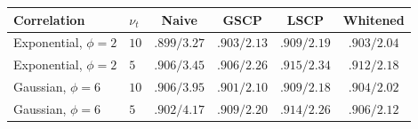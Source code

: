 \begin{tabular}{llcccc}
\toprule
Correlation & $\nu_t$ & Naive & GSCP & LSCP & Whitened\\
\midrule
Exponential, $\phi=2$ & $10$ & $.899/3.27$ & $.903/2.13$ & $.909/2.19$ & $.903/\mathbf{2.04}$\\
Exponential, $\phi=2$ & $5$ & $.906/3.45$ & $.906/2.26$ & $.915/2.34$ & $.912/\mathbf{2.18}$\\
Gaussian, $\phi=6$ & $10$ & $.906/3.95$ & $.901/2.10$ & $.909/2.18$ & $.904/\mathbf{2.02}$\\
Gaussian, $\phi=6$ & $5$ & $.902/4.17$ & $.909/2.20$ & $.914/2.26$ & $.906/\mathbf{2.12}$\\
\bottomrule
\end{tabular}
